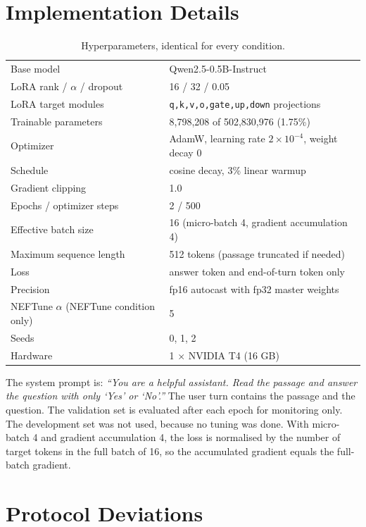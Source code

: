\documentclass[11pt]{article}
\begin{document}
\appendix

\section{Implementation Details}
\label{app:details}

\begin{table}[h]
\centering
\small
\caption{Hyperparameters, identical for every condition.}
\label{tab:hparams}
\begin{tabular}{@{}ll@{}}
\toprule
Base model & Qwen2.5-0.5B-Instruct \\
LoRA rank / $\alpha$ / dropout & 16 / 32 / 0.05 \\
LoRA target modules & \texttt{q,k,v,o,gate,up,down} projections \\
Trainable parameters & 8{,}798{,}208 of 502{,}830{,}976 (1.75\%) \\
Optimizer & AdamW, learning rate $2\times10^{-4}$, weight decay 0 \\
Schedule & cosine decay, 3\% linear warmup \\
Gradient clipping & 1.0 \\
Epochs / optimizer steps & 2 / 500 \\
Effective batch size & 16 (micro-batch 4, gradient accumulation 4) \\
Maximum sequence length & 512 tokens (passage truncated if needed) \\
Loss & answer token and end-of-turn token only \\
Precision & fp16 autocast with fp32 master weights \\
NEFTune $\alpha$ (NEFTune condition only) & 5 \\
Seeds & 0, 1, 2 \\
Hardware & 1 $\times$ NVIDIA T4 (16 GB) \\
\bottomrule
\end{tabular}
\end{table}

The system prompt is: \emph{``You are a helpful assistant. Read the passage and answer the question with only `Yes' or `No'.''} The user turn contains the passage and the question. The validation set is evaluated after each epoch for monitoring only. The development set was not used, because no tuning was done. With micro-batch 4 and gradient accumulation 4, the loss is normalised by the number of target tokens in the full batch of 16, so the accumulated gradient equals the full-batch gradient.

\section{Protocol Deviations}
\label{app:deviations}
\end{document}
